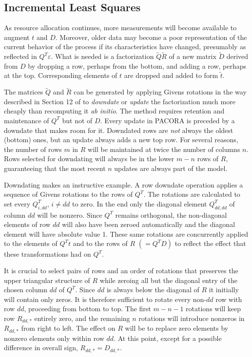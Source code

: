 \subsection*{Incremental Least Squares}

As resource allocation continues, more measurements will become available to augment $t$ and $D$.
Moreover, older data may become a poor representation of the current behavior of the process if its characteristics have changed,
presumably as reflected in $Q^T\varepsilon$.
What is needed is a factorization $\tilde{Q}\tilde{R}$ of a new matrix $\tilde{D}$
derived from $D$ by dropping a row, perhaps from the bottom,
and adding a row, perhaps at the top.
Corresponding elements of $t$ are dropped and added to form $\tilde{t}$.

The matrices $\tilde{Q}$ and $\tilde{R}$ can be generated by applying Givens rotations
in the way described in Section 12 of \cite{GoVL} to \emph{downdate} or \emph{update} the factorization
much more cheaply than recomputing it \emph{ab initio}.
The method requires retention and maintenance of $Q^T$ but not of $D$.
Every update in PACORA is preceded by a downdate that makes room for it.
Downdated rows are \emph{not} always the oldest (bottom) ones, but
an update always adds a new top row.
For several reasons, the number of rows $m$ in $R$
will be maintained at twice the number of columns $n$.
Rows selected for downdating will always be in the lower $m - n$ rows of $R$,
guaranteeing that the most recent $n$ updates are always part of the model.

Downdating makes an instructive example. A row downdate operation applies
a sequence of Givens rotations to the rows of $Q^T$.
The rotations are calculated to set every $Q^T_{i,dd}$, $i \neq dd$ to zero.
In the end only the diagonal element $Q^T_{dd,dd}$ of column $dd$ will be nonzero.
Since $Q^T$ remains orthogonal, the non-diagonal elements of row $dd$ will also have been zeroed automatically
and the diagonal element will have absolute value 1.
These same rotations are concurrently applied to the elements of $Q^T t$ and to the rows of $R$ $(= Q^T D)$
to reflect the effect that these transformations had on $Q^T$.

It is crucial to select pairs of rows and an order of rotations that preserves the upper triangular structure of $R$
while zeroing all but the diagonal entry of the chosen column $dd$ of $Q^T$.
Since $dd$ is always below the diagonal of $R$ it initially will contain only zeros.
It is therefore sufficient to rotate every non-$dd$ row with row $dd$, proceeding from bottom to top.
The first $m - n - 1$ rotations will keep row $R_{dd,*}$ entirely zero,
and the remaining $n$ rotations will introduce nonzeros in $R_{dd,*}$ from right to left.
The effect on $R$ will be to replace zero elements by nonzero elements only within row $dd$.
At this point, except for a possible difference in overall sign, $R_{dd,*} = D_{dd,*}$.

